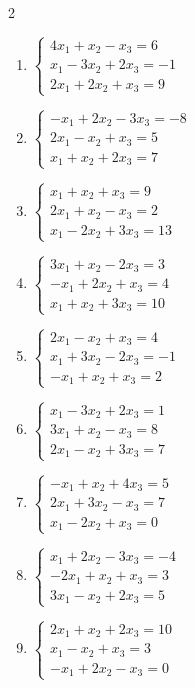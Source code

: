 \begin{multicols}{2}
\begin{enumerate}[label=\arabic*., leftmargin=*]
\item $\begin{cases}4x_1+x_2-x_3=6\\x_1-3x_2+2x_3=-1\\2x_1+2x_2+x_3=9\end{cases}$

\item $\begin{cases}-x_1+2x_2-3x_3=-8\\2x_1-x_2+x_3=5\\x_1+x_2+2x_3=7\end{cases}$

\item $\begin{cases}x_1+x_2+x_3=9\\2x_1+x_2-x_3=2\\x_1-2x_2+3x_3=13\end{cases}$

\item $\begin{cases}3x_1+x_2-2x_3=3\\-x_1+2x_2+x_3=4\\x_1+x_2+3x_3=10\end{cases}$

\item $\begin{cases}2x_1-x_2+x_3=4\\x_1+3x_2-2x_3=-1\\-x_1+x_2+x_3=2\end{cases}$

\item $\begin{cases}x_1-3x_2+2x_3=1\\3x_1+x_2-x_3=8\\2x_1-x_2+3x_3=7\end{cases}$

\item $\begin{cases}-x_1+x_2+4x_3=5\\2x_1+3x_2-x_3=7\\x_1-2x_2+x_3=0\end{cases}$

\item $\begin{cases}x_1+2x_2-3x_3=-4\\-2x_1+x_2+x_3=3\\3x_1-x_2+2x_3=5\end{cases}$

\item $\begin{cases}2x_1+x_2+2x_3=10\\x_1-x_2+x_3=3\\-x_1+2x_2-x_3=0\end{cases}$


\end{enumerate}
\end{multicols}
